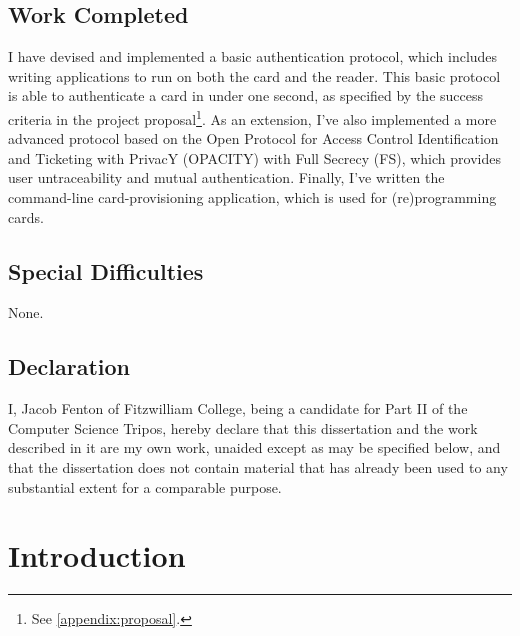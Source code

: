 \documentclass[12pt,a4paper,twoside,openright]{report}
\begin{document}
\section*{Work Completed}

I have devised and implemented a basic authentication protocol, which includes writing applications to run on both the card and the reader. This basic protocol is able to authenticate a card in under one second, as specified by the success criteria in the project proposal\footnote{See \autoref{appendix:proposal}.}. As an extension, I've also implemented a more advanced protocol based on the Open Protocol for Access Control Identification and Ticketing with PrivacY (OPACITY) \cite{OPACITY} with Full Secrecy (FS), which provides user untraceability and mutual authentication. Finally, I've written the command-line card-provisioning application, which is used for (re)programming cards.

\section*{Special Difficulties}

None.
 
\newpage
\section*{Declaration}

I, Jacob Fenton of Fitzwilliam College, being a candidate for Part II of the Computer
Science Tripos, hereby declare that this dissertation and the work described in it are my own work,
unaided except as may be specified below, and that the dissertation
does not contain material that has already been used to any substantial
extent for a comparable purpose.

\bigskip
{}

\medskip
{}

\tableofcontents

\listoffigures

\newpage


\pagestyle{headings}

\chapter{Introduction}
\end{document}
